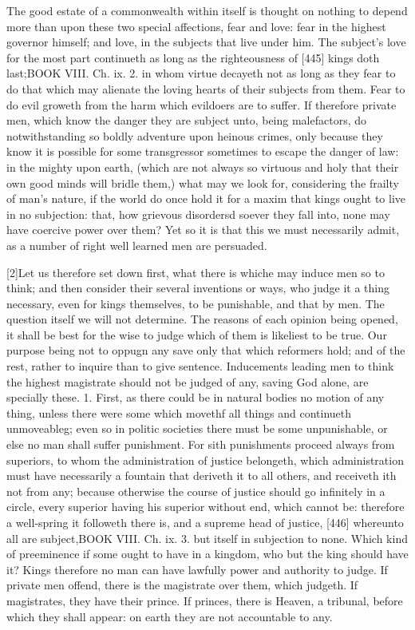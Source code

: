 The good estate of a commonwealth within itself is thought on nothing to depend more than upon these two special affections, fear and love: fear in the highest governor himself; and love, in the subjects that live under him. The subject’s love for the most part continueth as long as the righteousness of [445] kings doth last;BOOK VIII. Ch. ix. 2. in whom virtue decayeth not as long as they fear to do that which may alienate the loving hearts of their subjects from them. Fear to do evil groweth from the harm which evildoers are to suffer. If therefore private men, which know the danger they are subject unto, being malefactors, do notwithstanding so boldly adventure upon heinous crimes, only because they know it is possible for some transgressor sometimes to escape the danger of law: in the mighty upon earth, (which are not always so virtuous and holy that their own good minds will bridle them,) what may we look for, considering the frailty of man’s nature, if the world do once hold it for a maxim that kings ought to live in no subjection: that, how grievous disordersd soever they fall into, none may have coercive power over them? Yet so it is that this we must necessarily admit, as a number of right well learned men are persuaded.

[2]Let us therefore set down first, what there is whiche may induce men so to think; and then consider their several inventions or ways, who judge it a thing necessary, even for kings themselves, to be punishable, and that by men. The question itself we will not determine. The reasons of each opinion being opened, it shall be best for the wise to judge which of them is likeliest to be true. Our purpose being not to oppugn any save only that which reformers hold; and of the rest, rather to inquire than to give sentence. Inducements leading men to think the highest magistrate should not be judged of any, saving God alone, are specially these. 1. First, as there could be in natural bodies no motion of any thing, unless there were some which movethf all things and continueth unmoveableg; even so in politic societies there must be some unpunishable, or else no man shall suffer punishment. For sith punishments proceed always from superiors, to whom the administration of justice belongeth, which administration must have necessarily a fountain that deriveth it to all others, and receiveth ith not from any; because otherwise the course of justice should go infinitely in a circle, every superior having his superior without end, which cannot be: therefore a well-spring it followeth there is, and a supreme head of justice, [446] whereunto all are subject,BOOK VIII. Ch. ix. 3. but itself in subjection to none. Which kind of preeminence if some ought to have in a kingdom, who but the king should have it? Kings therefore no man can have lawfully power and authority to judge. If private men offend, there is the magistrate over them, which judgeth. If magistrates, they have their prince. If princes, there is Heaven, a tribunal, before which they shall appear: on earth they are not accountable to any.

